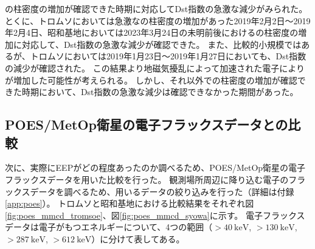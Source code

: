 の柱密度の増加が確認できた時期に対応してDst指数の急激な減少がみられた。
とくに、トロムソにおいては急激なの柱密度の増加があった2019年2月2日〜2019年2月4日、昭和基地においては2023年3月24日の未明前後におけるの柱密度の増加に対応して、Dst指数の急激な減少が確認できた。
また、比較的小規模ではあるが、トロムソにおいては2019年1月23日〜2019年1月27日においても、Dst指数の減少が確認された。
この結果より地磁気擾乱によって加速された電子によりが増加した可能性が考えられる。
しかし、それ以外での柱密度の増加が確認できた時期において、Dst指数の急激な減少は確認できなかった期間があった。


\subsection{POES/MetOp衛星の電子フラックスデータとの比較}
\label{ssec:comparison_poes}
次に、実際にEEPがどの程度あったのか調べるため、POES/MetOp衛星の電子フラックスデータを用いた比較を行った。
観測場所周辺に降り込む電子のフラックスデータを調べるため、用いるデータの絞り込みを行った（詳細は付録\ref{app:poes}）。
トロムソと昭和基地における比較結果をそれぞれ図\ref{fig:poes_mmcd_tromsoe}、図\ref{fig:poes_mmcd_syowa}に示す。
電子フラックスデータは電子がもつエネルギーについて、4つの範囲（$>40\ \mathrm{keV}$, $>130\ \mathrm{keV}$, $>287\ \mathrm{keV}$, $>612\ \mathrm{keV}$）に分けて表してある。
